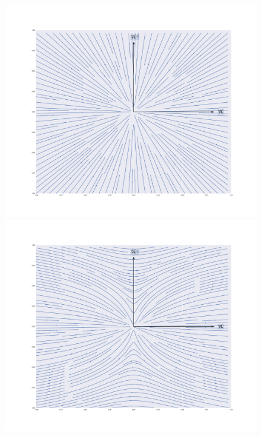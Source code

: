 \begin{figure}\label{fig:trajectories}
    \centering
    \includegraphics[width=\linewidth]{figures/dynamics_delta_-100.pdf}
    \endminipage\hfill
    \includegraphics[width=\linewidth]{figures/dynamics_delta_0.pdf}
    \endminipage\hfill

\end{figure}
